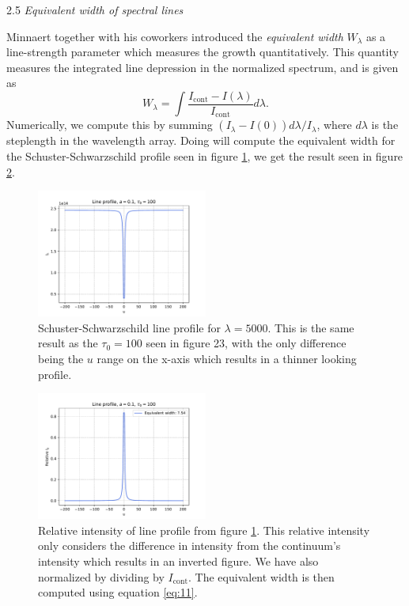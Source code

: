 \documentclass[a4paper,11.5pt,]{article}
\begin{document}
\begin{multicols}{2}
\begin{center}
2.5\textit{ Equivalent width of spectral lines}
\end{center}
Minnaert together with his coworkers introduced the \textit{equivalent width} $W_\lambda$ as a line-strength parameter which measures the growth quantitatively. This quantity measures the integrated line depression in the normalized spectrum, and is given as
\begin{equation}\label{eq:11}
    W_\lambda = \int \frac{I_\text{cont} - I(\lambda)}{I_\text{cont}} d\lambda.
\end{equation}
Numerically, we compute this by summing $(I_\lambda - I(0))d\lambda/I_\lambda$, where $d\lambda$ is the steplength in the wavelength array. Doing will compute the equivalent width for the Schuster-Schwarzschild profile seen in figure \ref{fig:25}, we get the result seen in figure \ref{fig:26}.

\begin{figure}[H]
	\centering
	\includegraphics[width=0.5\textwidth]{SSA/figures/lprof.pdf}
	\caption{Schuster-Schwarzschild line profile for $\lambda = 5000$. This is the same result as the $\tau_0 = 100$ seen in figure 23, with the only difference being the $u$ range on the x-axis which results in a thinner looking profile.}
	\label{fig:25}
\end{figure}

\begin{figure}[H]
	\centering
	\includegraphics[width=0.5\textwidth]{SSA/figures/eqwidth.pdf}
	\caption{Relative intensity of line profile from figure \ref{fig:25}. This relative intensity only considers the difference in intensity from the continuum's intensity which results in an inverted figure. We have also normalized by dividing by $I_\text{cont}$. The equivalent width is then computed using equation \eqref{eq:11}.}
	\label{fig:26}
\end{figure}


\end{multicols}
\end{document}
